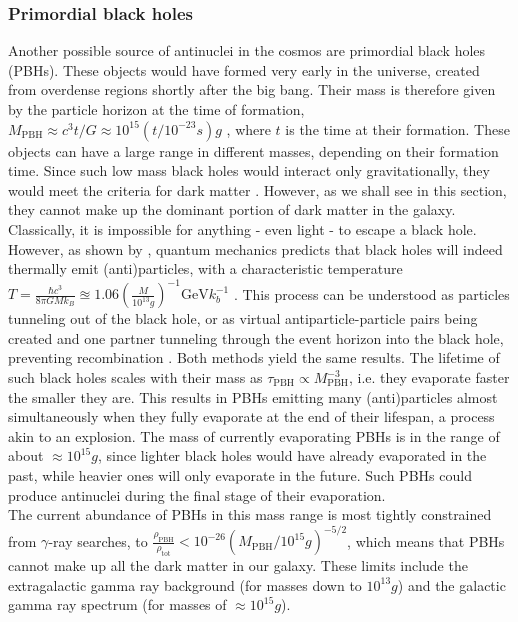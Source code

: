 \subsubsection{Primordial black holes}\label{Res:PBH}
Another possible source of antinuclei in the cosmos are primordial black holes (PBHs). These objects would have formed very early in the universe, created from overdense regions shortly after the big bang. Their mass is therefore given by the particle horizon at the time of formation, $M_\mathrm{PBH} \approx c^3t/G \approx 10^{15} (t/10^{-23}s)g$ \cite{}, where $t$ is the time at their formation. These objects can have a large range in different masses, depending on their formation time. Since such low mass black holes would interact only gravitationally, they would meet the criteria for dark matter \cite{}. However, as we shall see in this section, they cannot make up the dominant portion of dark matter in the galaxy. \\
Classically, it is impossible for anything - even light - to escape a black hole. However, as shown by \cite{}, quantum mechanics predicts that black holes will indeed thermally emit (anti)particles, with a characteristic temperature $T = \frac{\hbar c^3}{8\pi GM k_B} \approxeq 1.06 \left( \frac{M}{10^{13}g}\right)^{-1} \mathrm{GeV} k_b^{-1}$ \cite{}. This process can be understood as particles tunneling out of the black hole\cite{}, or as virtual antiparticle-particle pairs being created and one partner tunneling through the event horizon into the black hole, preventing recombination \cite{}. Both methods yield the same results. The lifetime of such black holes scales with their mass as $\tau_\mathrm{PBH} \propto M_\mathrm{PBH}^{-3}$, i.e. they evaporate faster the smaller they are. This results in PBHs emitting many (anti)particles almost simultaneously when they fully evaporate at the end of their lifespan, a process akin to an explosion. The mass of currently evaporating PBHs is in the range of about $\approx 10^{15}g$, since lighter black holes would have already evaporated in the past, while heavier ones will only evaporate in the future. Such PBHs could produce antinuclei during the final stage of their evaporation. \\
The current abundance of PBHs in this mass range is most tightly constrained from $\gamma$-ray searches\cite{}, to $\frac{\rho_\mathrm{PBH}}{\rho_\mathrm{tot}} < 10^{-26} (M_\mathrm{PBH}/10^{15}g)^{-5/2}$, which means that PBHs cannot make up all the dark matter in our galaxy. These limits include the extragalactic gamma ray background (for masses down to $10^{13}g$) and the galactic gamma ray spectrum (for masses of $\approx 10^{15}g$).\\

